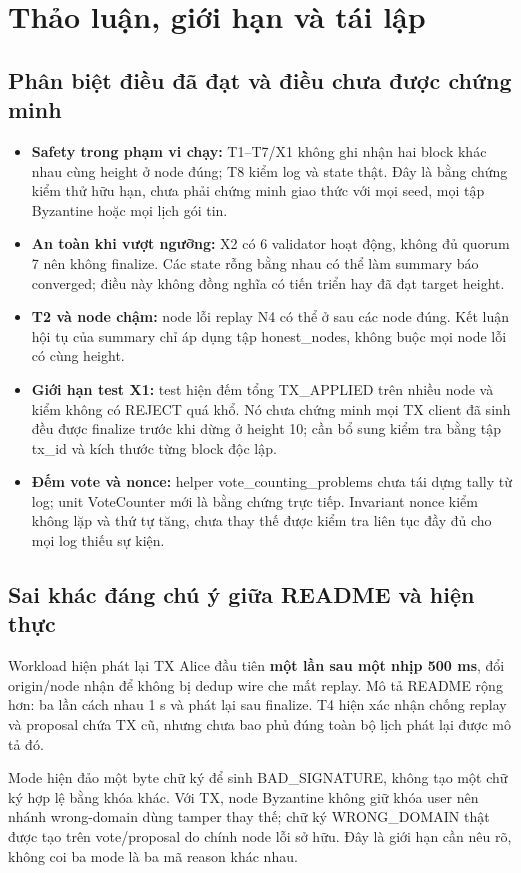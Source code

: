 \documentclass[11pt,a4paper]{article}
\newcommand{\code}[1]{\texttt{\detokenize{#1}}}
\newcommand{\key}[1]{\textbf{\color{navy}#1}}
\newcommand{\nextpage}{\clearpage}
\begin{document}
\nextpage
\section{Thảo luận, giới hạn và tái lập}
\subsection{Phân biệt điều đã đạt và điều chưa được chứng minh}
\begin{itemize}
\item \key{Safety trong phạm vi chạy:} T1--T7/X1 không ghi nhận hai block khác nhau cùng height ở node đúng; T8 kiểm log và state thật. Đây là bằng chứng kiểm thử hữu hạn, chưa phải chứng minh giao thức với mọi seed, mọi tập Byzantine hoặc mọi lịch gói tin.
\item \key{An toàn khi vượt ngưỡng:} X2 có 6 validator hoạt động, không đủ quorum 7 nên không finalize. Các state rỗng bằng nhau có thể làm summary báo converged; điều này không đồng nghĩa có tiến triển hay đã đạt target height.
\item \key{T2 và node chậm:} node lỗi replay N4 có thể ở sau các node đúng. Kết luận hội tụ của summary chỉ áp dụng tập honest\_nodes, không buộc mọi node lỗi có cùng height.
\item \key{Giới hạn test X1:} test hiện đếm tổng TX\_APPLIED trên nhiều node và kiểm không có REJECT quá khổ. Nó chưa chứng minh mọi TX client đã sinh đều được finalize trước khi dừng ở height 10; cần bổ sung kiểm tra bằng tập tx\_id và kích thước từng block độc lập.
\item \key{Đếm vote và nonce:} helper vote\_counting\_problems chưa tái dựng tally từ log; unit VoteCounter mới là bằng chứng trực tiếp. Invariant nonce kiểm không lặp và thứ tự tăng, chưa thay thế được kiểm tra liên tục đầy đủ cho mọi log thiếu sự kiện.
\end{itemize}

\subsection{Sai khác đáng chú ý giữa README và hiện thực}
Workload \code{replay_alice} hiện phát lại TX Alice đầu tiên \textbf{một lần sau một nhịp 500 ms}, đổi origin/node nhận để không bị dedup wire che mất replay. Mô tả README rộng hơn: ba lần cách nhau 1 s và phát lại sau finalize. T4 hiện xác nhận chống replay và proposal chứa TX cũ, nhưng chưa bao phủ đúng toàn bộ lịch phát lại được mô tả đó.

Mode \code{bad_key} hiện đảo một byte chữ ký để sinh BAD\_SIGNATURE, không tạo một chữ ký hợp lệ bằng khóa khác. Với TX, node Byzantine không giữ khóa user nên nhánh wrong-domain dùng tamper thay thế; chữ ký WRONG\_DOMAIN thật được tạo trên vote/proposal do chính node lỗi sở hữu. Đây là giới hạn cần nêu rõ, không coi ba mode là ba mã reason khác nhau.
\end{document}
